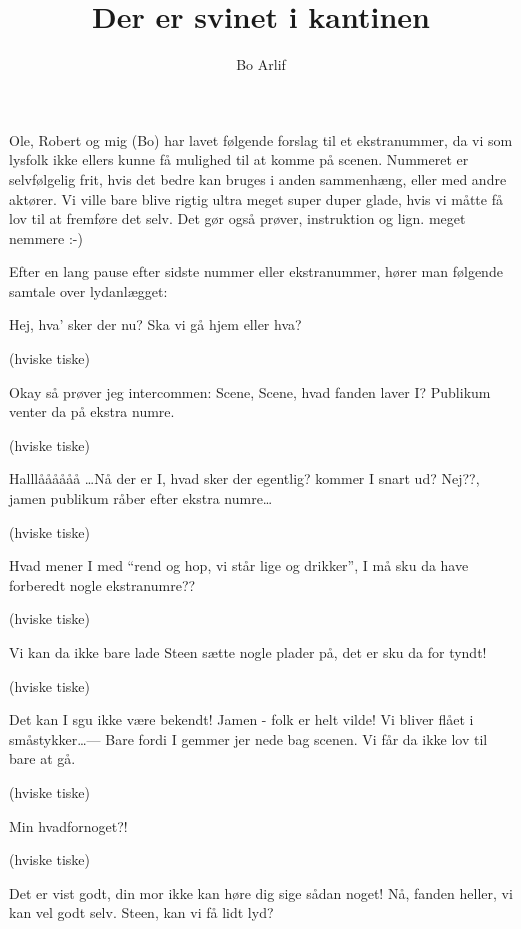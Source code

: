 \documentclass[a4paper,11pt]{article}
\title{Der er svinet i kantinen}
\author{Bo Arlif}
\begin{document}
\maketitle

\begin{roles}
\strut
\end{roles}


Ole, Robert og mig (Bo) har lavet følgende forslag til et
ekstranummer, da vi som lysfolk ikke ellers kunne få mulighed til at
komme på scenen. Nummeret er selvfølgelig frit, hvis det bedre kan
bruges i anden sammenhæng, eller med andre aktører. Vi ville bare
blive rigtig ultra meget super duper glade, hvis vi måtte få lov til
at fremføre det selv. Det gør også prøver, instruktion og lign. meget
nemmere :-)

\begin{sketch}

\scene
Efter en lang pause efter sidste nummer eller ekstranummer, hører man
følgende samtale over lydanlægget:

 Hej, hva' sker der nu? Ska vi gå hjem eller hva?

\scene
(hviske tiske)

 Okay så prøver jeg intercommen: Scene, Scene, hvad fanden laver I?
     Publikum venter da på ekstra numre.

\scene
(hviske tiske)

 Halllåååååå \dots Nå der er I, hvad sker der egentlig? kommer I snart
     ud? Nej??, jamen publikum råber efter ekstra numre\dots

\scene
(hviske tiske)

 Hvad mener I med ``rend og hop, vi står lige og drikker'', I må sku
     da have forberedt nogle ekstranumre??

\scene
(hviske tiske)

 Vi kan da ikke bare lade Steen sætte nogle plader på, det
er sku da
     for tyndt!

\scene
(hviske tiske)

 Det kan I sgu ikke være bekendt! Jamen - folk er helt vilde! Vi
     bliver flået i småstykker\dots --- Bare fordi I gemmer jer nede bag
     scenen. Vi får da ikke lov til bare at gå.

\scene
(hviske tiske)

 Min hvadfornoget?!

\scene
(hviske tiske)

 Det er vist godt, din mor ikke kan høre dig sige sådan noget!
   Nå, fanden heller, vi kan vel godt selv. Steen, kan vi få lidt lyd?



\end{sketch}
\end{document}
